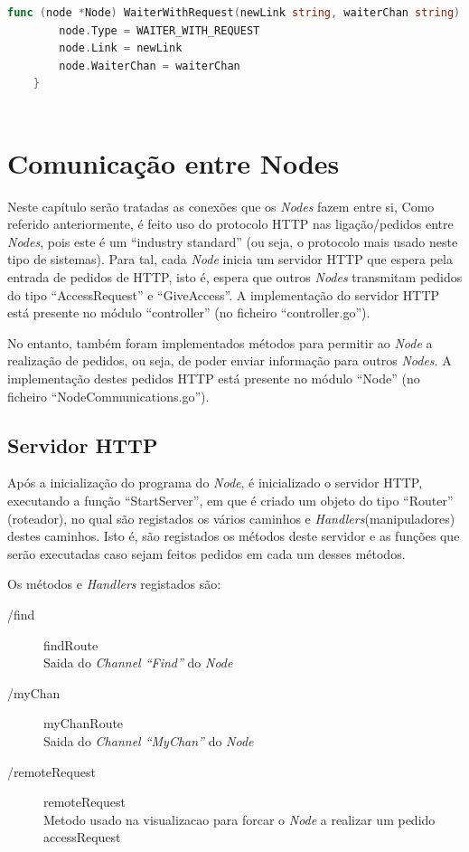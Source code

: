 \begin{lstlisting}[caption={Método/transformação ``WaiterWithRequest''},language=Go]
	func (node *Node) WaiterWithRequest(newLink string, waiterChan string) {
		node.Type = WAITER_WITH_REQUEST
		node.Link = newLink
		node.WaiterChan = waiterChan
	}
	
\end{lstlisting}

\section{Comunicação entre Nodes}

Neste capítulo serão tratadas as conexões que os \emph{Nodes} fazem entre si,
Como referido anteriormente, é feito uso do protocolo \acs{HTTP} nas ligação/pedidos entre \emph{Nodes}, pois este é um ``industry standard'' (ou seja, o protocolo mais usado neste tipo de sistemas).
Para tal, cada \emph{Node} inicia um servidor \acs{HTTP} que espera pela entrada de pedidos de HTTP, isto é, espera que outros \emph{Nodes} transmitam pedidos do tipo ``AccessRequest'' e ``GiveAccess''.
A implementação do servidor \acs{HTTP} está presente no módulo ``controller'' (no ficheiro ``controller.go'').

No entanto, também foram implementados métodos para permitir ao \emph{Node} a realização de pedidos, ou seja, de poder enviar informação para outros \emph{Nodes}.
A implementação destes pedidos \acs{HTTP} está presente no módulo ``Node'' (no ficheiro ``NodeCommunications.go'').



\subsection*{Servidor \acs{HTTP}}
Após a inicialização do programa do \emph{Node}, é inicializado o servidor \acs{HTTP}, executando a função ``StartServer'', em que é criado um objeto do tipo ``Router'' (roteador),  
no qual são registados os vários caminhos e \emph{Handlers}(manipuladores) destes caminhos. Isto é, são registados os métodos deste servidor e as funções que serão executadas
caso sejam feitos pedidos em cada um desses métodos.

Os métodos e \emph{Handlers} registados são:


\begin{description}
	\item [/find] findRoute \\ Saida do \emph{Channel ``Find''} do \emph{Node}
	\item [/myChan] myChanRoute \\ Saida do \emph{Channel ``MyChan''} do \emph{Node}
	\item [/remoteRequest] remoteRequest \\ Metodo usado na visualizacao para forcar o \emph{Node} a realizar um pedido accessRequest
\end{description}

